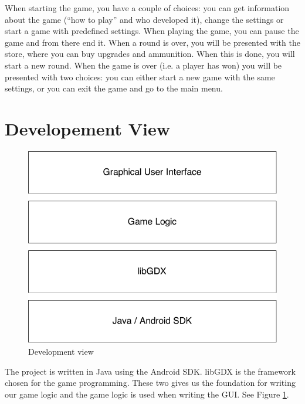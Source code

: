 When starting the game, you have a couple of choices: you can get information about the game (“how to play” and who developed it), change the settings or start a game with predefined settings. When playing the game, you can pause the game and from there end it. When a round is over, you will be presented with the store, where you can buy upgrades and ammunition. When this is done, you will start a new round. When the game is over (i.e. a player has won) you will be presented with two choices: you can either start a new game with the same settings, or you can exit the game and go to the main menu.


\section{Developement View}

\begin{figure}
\centering
\includegraphics[scale=0.4]{images/development_view.png}
\caption{Development view}
\label{fig:development-view}
\end{figure}

The project is written in Java using the Android SDK. libGDX is the framework chosen for the game programming. These two gives us the foundation for writing our game logic and the game logic is used when writing the GUI. See Figure \ref{fig:development-view}.

